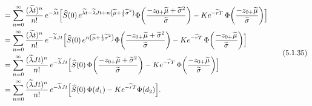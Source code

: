 \documentclass[12pt,a4paper]{report}
\numberwithin{equation}{section}
\begin{document}
\begin{equation}
\begin{aligned}
&= \sum_{n=0}^{\infty}\frac{(\widetilde{\lambda t})^{n}}{n!}\,e^{-\widetilde{\lambda t}}
\Bigl[
\widehat{S}(0)\,e^{\widetilde{\lambda t}-\widetilde{\lambda}Jt+n\left(\widetilde{\mu}+\frac{1}{2}\widetilde{\sigma}^{2}\right)}
\Phi\!\left(\frac{-z_{0+}\widetilde{\mu}+\widetilde{\sigma}^{2}}{\widetilde{\sigma}}\right)
- K e^{-\widetilde{r}T}\,
\Phi\!\left(\frac{-z_{0+}\widetilde{\mu}}{\widetilde{\sigma}}\right)
\Bigr] \\
&= \sum_{n=0}^{\infty}\frac{(\widetilde{\lambda t})^{n}}{n!}\,e^{-\widetilde{\lambda}Jt}
\Bigl[
\widehat{S}(0)\,e^{n\left(\widetilde{\mu}+\frac{1}{2}\widetilde{\sigma}^{2}\right)}
\Phi\!\left(\frac{-z_{0+}\widetilde{\mu}+\widetilde{\sigma}^{2}}{\widetilde{\sigma}}\right)
- K e^{-\widetilde{r}T}\,
\Phi\!\left(\frac{-z_{0+}\widetilde{\mu}}{\widetilde{\sigma}}\right)
\Bigr] \\
&= \sum_{n=0}^{\infty}\frac{(\widetilde{\lambda}Jt)^{n}}{n!}\,e^{-\widetilde{\lambda}Jt}
\Bigl[
\widehat{S}(0)\,\Phi\!\left(\frac{-z_{0+}\widetilde{\mu}+\widetilde{\sigma}^{2}}{\widetilde{\sigma}}\right)
- K e^{-\widetilde{r}T}\,
\Phi\!\left(\frac{-z_{0+}\widetilde{\mu}}{\widetilde{\sigma}}\right)
\Bigr] \\
&= \sum_{n=0}^{\infty}\frac{(\widetilde{\lambda}Jt)^{n}}{n!}\,e^{-\widetilde{\lambda}Jt}
\Bigl[\widehat{S}(0)\,\Phi(d_{1})-K e^{-\widetilde{r}T}\Phi(d_{2})\Bigr].
\end{aligned}
\tag{5.1.35}\label{eq:5.1.35}
\end{equation}
\end{document}
